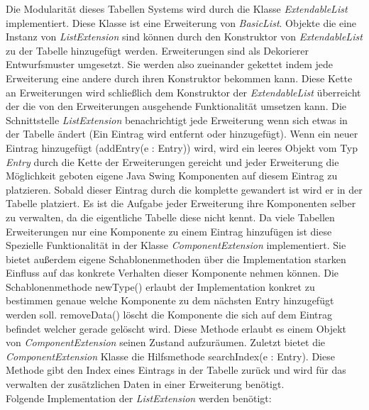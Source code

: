 \documentclass[parskip=full]{scrartcl}
\begin{document}
		Die Modularität dieses Tabellen Systems wird durch die Klasse \textit{ExtendableList} implementiert. Diese Klasse ist eine Erweiterung von \textit{BasicList}. Objekte die eine Instanz von \textit{ListExtension} sind können durch den Konstruktor von \textit{ExtendableList} zu der Tabelle hinzugefügt werden. Erweiterungen sind als Dekorierer Entwurfsmuster umgesetzt. Sie werden also zueinander gekettet indem jede Erweiterung eine andere durch ihren Konstruktor bekommen kann. Diese Kette an Erweiterungen wird schließlich dem Konstruktor der \textit{ExtendableList} überreicht der die von den Erweiterungen ausgehende Funktionalität umsetzen kann. Die Schnittstelle \textit{ListExtension} benachrichtigt jede Erweiterung wenn sich etwas in der Tabelle ändert (Ein Eintrag wird entfernt oder hinzugefügt). Wenn ein neuer Eintrag hinzugefügt (addEntry(e : Entry)) wird, wird ein leeres Objekt vom Typ \textit{Entry} durch die Kette der Erweiterungen gereicht und jeder Erweiterung die Möglichkeit geboten eigene Java Swing Komponenten auf diesem Eintrag zu platzieren. Sobald dieser Eintrag durch die komplette gewandert ist wird er in der Tabelle platziert. Es ist die Aufgabe jeder Erweiterung ihre Komponenten selber zu verwalten, da die eigentliche Tabelle diese nicht kennt. Da viele Tabellen Erweiterungen nur eine Komponente zu einem Eintrag hinzufügen ist diese Spezielle Funktionalität in der Klasse \textit{ComponentExtension} implementiert. Sie bietet außerdem eigene Schablonenmethoden über die Implementation starken Einfluss auf das konkrete Verhalten dieser Komponente nehmen können. Die Schablonenmethode newType() erlaubt der Implementation konkret zu bestimmen genaue welche Komponente zu dem nächsten Entry hinzugefügt werden soll. removeData() löscht die Komponente die sich auf dem Eintrag befindet welcher gerade gelöscht wird. Diese Methode erlaubt es einem Objekt von \textit{ComponentExtension} seinen Zustand aufzuräumen. Zuletzt bietet die \textit{ComponentExtension} Klasse die Hilfsmethode searchIndex(e : Entry). Diese Methode gibt den Index eines Eintrags in der Tabelle zurück und wird für das verwalten der zusätzlichen Daten in einer Erweiterung benötigt.
		\\
		Folgende Implementation der \textit{ListExtension} werden benötigt:
\end{document}
